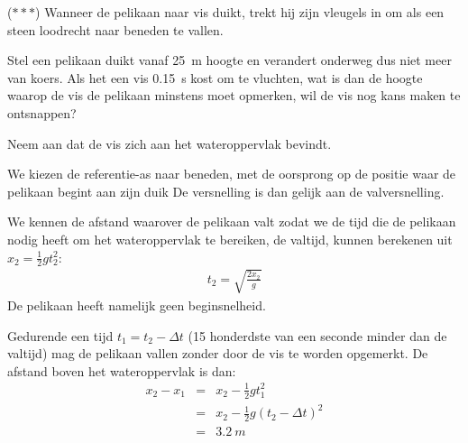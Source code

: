\documentclass{ximera}
\begin{document}
\begin{exercise}
    ($\ast\ast\ast$) Wanneer de pelikaan naar vis duikt, trekt hij zijn vleugels in om als een steen loodrecht naar beneden te vallen.

    Stel een pelikaan duikt vanaf \SI{25}{m} hoogte en verandert onderweg dus niet meer van koers. Als het een vis \SI{0,15}{s} kost om te vluchten, wat is dan de hoogte waarop de vis de pelikaan minstens moet opmerken, wil de vis nog kans maken te ontsnappen?

    Neem aan dat de vis zich aan het wateroppervlak bevindt.

    \begin{oplossing}
        We kiezen de referentie-as naar beneden, met de oorsprong op de positie waar de pelikaan begint aan zijn duik De versnelling is dan gelijk aan de valversnelling. 

        We kennen de afstand waarover de pelikaan valt zodat we de tijd die de pelikaan nodig heeft om het wateroppervlak te bereiken, de valtijd, kunnen berekenen uit $x_2=\frac{1}{2}gt_2^2 $:
        \begin{eqnarray*}
            t_2=\sqrt{\frac{2x_2}{g}}
        \end{eqnarray*}
        De pelikaan heeft namelijk geen beginsnelheid.

        Gedurende een tijd $t_1=t_2-\Delta t$ (15 honderdste van een seconde minder dan de valtijd) mag de pelikaan vallen zonder door de vis te worden opgemerkt. De afstand boven het wateroppervlak is dan:
        \begin{eqnarray*}
            x_2-x_1&=&x_2-\frac{1}{2}gt_1^2\\
            &=&x_2-\frac{1}{2}g\left(t_2-\Delta t\right)^2\\
            &=&\SI{3,2}{m}
        \end{eqnarray*}
    \end{oplossing} 
\end{exercise}
\end{document}
